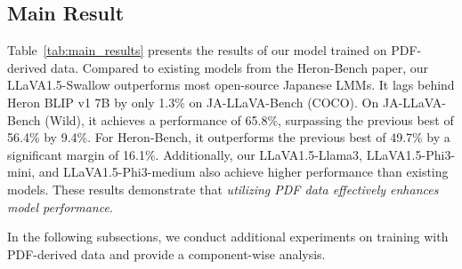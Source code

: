 \subsection{Main Result}
Table~\ref{tab:main_results} presents the results of our model trained on PDF-derived data.
Compared to existing models from the Heron-Bench paper, our LLaVA1.5-Swallow outperforms most open-source Japanese LMMs.
It lags behind Heron BLIP v1 7B by only 1.3\% on JA-LLaVA-Bench (COCO).
On JA-LLaVA-Bench (Wild), it achieves a performance of 65.8\%, surpassing the previous best of 56.4\% by 9.4\%.
For Heron-Bench, it outperforms the previous best of 49.7\% by a significant margin of 16.1\%.
Additionally, our LLaVA1.5-Llama3, LLaVA1.5-Phi3-mini, and LLaVA1.5-Phi3-medium also achieve higher performance than existing models.
These results demonstrate that \textit{utilizing PDF data effectively enhances model performance}.

In the following subsections, we conduct additional experiments on training with PDF-derived data and provide a component-wise analysis.


